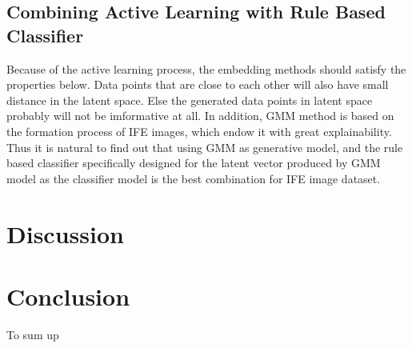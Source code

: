 \documentclass[10pt,twocolumn,letterpaper]{article}
\begin{document}
\subsection{Combining Active Learning with Rule Based Classifier}
Because of the active learning process, the embedding methods should satisfy the properties below. Data points that are close to each other will also have small distance in the latent space. Else the generated data points in latent space probably will not be imformative at all. In addition, GMM method is based on the formation process of IFE images, which endow it with great explainability. Thus it is natural to find out that using GMM as generative model, and the rule based classifier specifically designed for the latent vector produced by GMM model as the classifier model is the best combination for IFE image dataset.

\section{Discussion}

\section{Conclusion}
To sum up


{\small


}
\end{document}
